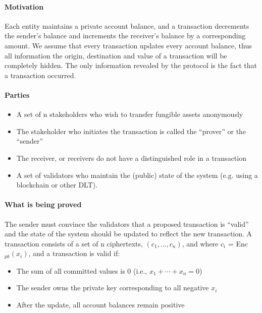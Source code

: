 \paragraph[:]{Motivation} Each entity maintains a private account balance, and a transaction decrements the sender's balance and increments the receiver's balance by a corresponding amount.  We assume that every transaction updates every account balance, thus all information the origin, destination and value of a transaction will be completely hidden.  The only information revealed by the protocol is the fact that a transaction occurred.

\paragraph[:]{Parties}
\begin{itemize}
    \item A set of n stakeholders who wish to transfer fungible assets anonymously
    \item The stakeholder who initiates the transaction is called the ``prover'' or the ``sender''
    \item The receiver, or receivers do not have a distinguished role in a transaction
    \item A set of validators who maintain the (public) state of the system (e.g. using a blockchain or other DLT).
\end{itemize}


\paragraph[:]{What is being proved}
The sender must convince the validators that a proposed transaction is ``valid'' and the state of the system should be updated to reflect the new transaction.  A transaction consists of a set of n ciphertexts, $(c_1, \ldots, c_n)$, and where $c_i$ = Enc$_{pk}(x_i)$, and a transaction is valid if:\loosen
\begin{itemize}
    \item The sum of all committed values is 0 (i.e., $x_1 + \cdots + x_n = 0$)
    \item The sender owns the private key corresponding to all negative $x_i$
    \item After the update, all account balances remain positive
\end{itemize}

